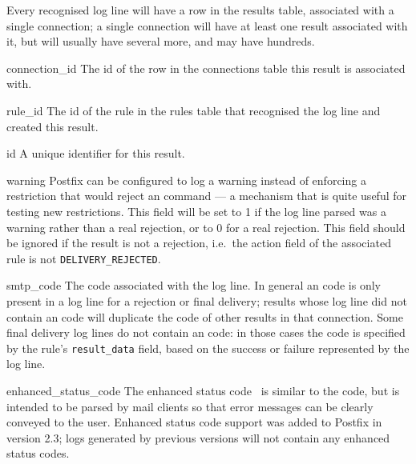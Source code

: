 \label{results table}

Every recognised log line will have a row in the results table, associated
with a single connection; a single connection will have at least one result
associated with it, but will usually have several more, and may have
hundreds.

\begin{boldeqlist}

    \item [connection\_id] The id of the row in the connections table this
        result is associated with.

    \item [rule\_id] The id of the rule in the rules table that recognised
        the log line and created this result.

    \item [id] A unique identifier for this result.

    \item [warning] Postfix can be configured to log a warning instead of
        enforcing a restriction that would reject an  command
        --- a mechanism that is quite useful for testing new restrictions.
        This field will be set to 1 if the log line parsed was a warning rather
        than a real rejection, or to 0 for a real rejection.  This field
        should be ignored if the result is not a rejection, i.e.\ the
        action field of the associated rule is not
        \texttt{DELIVERY\_REJECTED}.

    \item [smtp\_code] The  code associated with the log
        line.  In general an  code is only present in a log
        line for a rejection or final delivery; results whose log line did
        not contain an  code will duplicate the
         code of other results in that connection.  Some
        final delivery log lines do not contain an  code: in
        those cases the  code is specified by the rule's
        \texttt{result\_data} field, based on the success or failure
        represented by the log line.

    \item [enhanced\_status\_code] The enhanced status code~\cite{RFC3463}
        is similar to the  code, but is intended to be parsed
        by mail clients so that error messages can be clearly conveyed to
        the user.  Enhanced status code support was added to Postfix in
        version 2.3; logs generated by previous versions will not contain
        any enhanced status codes.


\end{boldeqlist}
